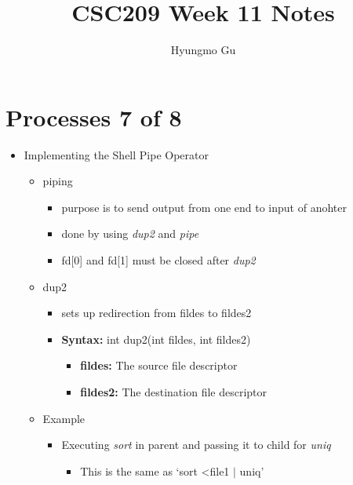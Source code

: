 \documentclass[12pt]{article}
\begin{document}
\title{CSC209 Week 11 Notes}
\author{Hyungmo Gu}
\maketitle

\section*{Processes 7 of 8}

\begin{itemize}
    \item Implementing the Shell Pipe Operator
    \begin{itemize}
        \item piping
        \begin{itemize}
            \item purpose is to send output from one end to input of anohter
            \item done by using \textit{dup2} and \textit{pipe}
            \item fd[0] and fd[1] must be closed after \textit{dup2}
        \end{itemize}
        \item dup2
        \begin{itemize}
            \item sets up redirection from fildes to fildes2
            \item \textbf{Syntax:} int dup2(int fildes, int fildes2)
            \begin{itemize}
                \item \textbf{fildes:} The source file descriptor
                \item \textbf{fildes2:} The destination file descriptor
            \end{itemize}
        \end{itemize}
        \item Example
        \begin{itemize}
            \item Executing \textit{sort} in parent and passing it to child for \textit{uniq}
            \begin{itemize}
                \item This is the same as `sort \textless file1 $\mid$ uniq'
            \end{itemize}


\end{itemize}
\end{itemize}
\end{itemize}
\end{document}
